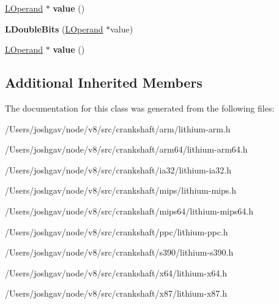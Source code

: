 \begin{DoxyCompactItemize}
\item 
\hyperlink{classv8_1_1internal_1_1_l_operand}{L\+Operand} $\ast$ {\bfseries value} ()\hypertarget{classv8_1_1internal_1_1_l_double_bits_a6ff4b071e81e54290632b921a40cc0b9}{}\label{classv8_1_1internal_1_1_l_double_bits_a6ff4b071e81e54290632b921a40cc0b9}

\item 
{\bfseries L\+Double\+Bits} (\hyperlink{classv8_1_1internal_1_1_l_operand}{L\+Operand} $\ast$value)\hypertarget{classv8_1_1internal_1_1_l_double_bits_a67a757a50180e39ad4cb0476a8be2904}{}\label{classv8_1_1internal_1_1_l_double_bits_a67a757a50180e39ad4cb0476a8be2904}

\item 
\hyperlink{classv8_1_1internal_1_1_l_operand}{L\+Operand} $\ast$ {\bfseries value} ()\hypertarget{classv8_1_1internal_1_1_l_double_bits_a6ff4b071e81e54290632b921a40cc0b9}{}\label{classv8_1_1internal_1_1_l_double_bits_a6ff4b071e81e54290632b921a40cc0b9}

\end{DoxyCompactItemize}
\subsection*{Additional Inherited Members}


The documentation for this class was generated from the following files\+:\begin{DoxyCompactItemize}
\item 
/\+Users/joshgav/node/v8/src/crankshaft/arm/lithium-\/arm.\+h\item 
/\+Users/joshgav/node/v8/src/crankshaft/arm64/lithium-\/arm64.\+h\item 
/\+Users/joshgav/node/v8/src/crankshaft/ia32/lithium-\/ia32.\+h\item 
/\+Users/joshgav/node/v8/src/crankshaft/mips/lithium-\/mips.\+h\item 
/\+Users/joshgav/node/v8/src/crankshaft/mips64/lithium-\/mips64.\+h\item 
/\+Users/joshgav/node/v8/src/crankshaft/ppc/lithium-\/ppc.\+h\item 
/\+Users/joshgav/node/v8/src/crankshaft/s390/lithium-\/s390.\+h\item 
/\+Users/joshgav/node/v8/src/crankshaft/x64/lithium-\/x64.\+h\item 
/\+Users/joshgav/node/v8/src/crankshaft/x87/lithium-\/x87.\+h\end{DoxyCompactItemize}
